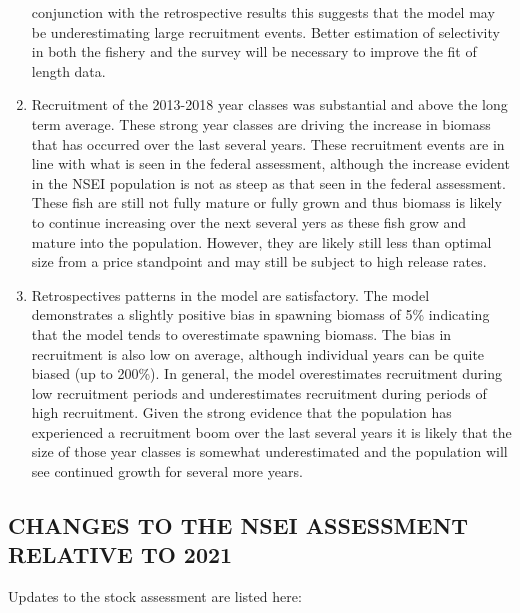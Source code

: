 \documentclass[
]{article}
\begin{document}
\begin{enumerate}
  conjunction with the retrospective results this suggests that the
  model may be underestimating large recruitment events. Better
  estimation of selectivity in both the fishery and the survey will be
  necessary to improve the fit of length data.
\item
  Recruitment of the 2013-2018 year classes was substantial and above
  the long term average. These strong year classes are driving the
  increase in biomass that has occurred over the last several years.
  These recruitment events are in line with what is seen in the federal
  assessment, although the increase evident in the NSEI population is
  not as steep as that seen in the federal assessment. These fish are
  still not fully mature or fully grown and thus biomass is likely to
  continue increasing over the next several yers as these fish grow and
  mature into the population. However, they are likely still less than
  optimal size from a price standpoint and may still be subject to high
  release rates.
\item
  Retrospectives patterns in the model are satisfactory. The model
  demonstrates a slightly positive bias in spawning biomass of 5\%
  indicating that the model tends to overestimate spawning biomass. The
  bias in recruitment is also low on average, although individual years
  can be quite biased (up to 200\%). In general, the model overestimates
  recruitment during low recruitment periods and underestimates
  recruitment during periods of high recruitment. Given the strong
  evidence that the population has experienced a recruitment boom over
  the last several years it is likely that the size of those year
  classes is somewhat underestimated and the population will see
  continued growth for several more years.
\end{enumerate}

\hypertarget{changes-to-the-nsei-assessment-relative-to-2021}{%
\subsection{CHANGES TO THE NSEI ASSESSMENT RELATIVE TO
2021}\label{changes-to-the-nsei-assessment-relative-to-2021}}

Updates to the stock assessment are listed here:
\end{document}
